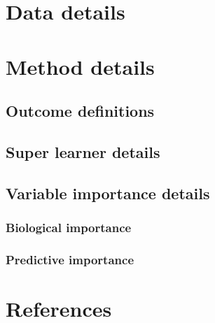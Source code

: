 \documentclass[]{article}
\begin{document}
\section{Data details}\label{sec:data}

\section{Method details}\label{sec:methods}

\subsection{Outcome definitions}\label{sec:outcomedefs}

\subsection{Super learner details}\label{sec:sldetails}

\subsection{Variable importance
details}\label{variable-importance-details}

\subsubsection{Biological importance}\label{sec:biolimp}

\subsubsection{Predictive importance}\label{predictive-importance}

\section{References}\label{sec:refs}


\end{document}

